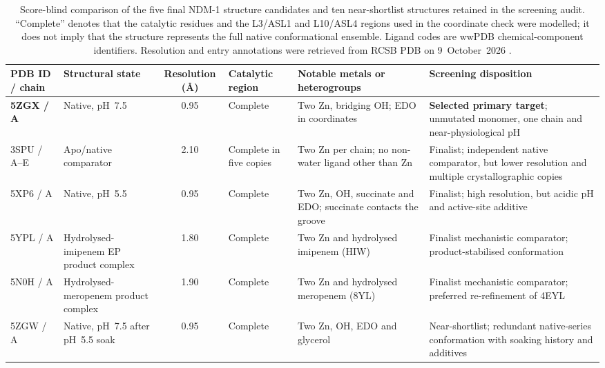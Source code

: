 \begin{table}[htbp]
  \centering
  \small
  \caption[NDM-1 structure candidates considered during target selection]{%
  Score-blind comparison of the five final NDM-1 structure candidates and
  ten near-shortlist structures retained in the screening audit. ``Complete''
  denotes that the catalytic residues and the L3/ASL1 and L10/ASL4 regions
  used in the coordinate check were modelled; it does not imply that the
  structure represents the full native conformational ensemble. Ligand codes
  are wwPDB chemical-component identifiers. Resolution and entry annotations
  were retrieved from RCSB PDB on 9~October~2026
  \cite{berman_protein_2000}.}
  \label{tab:ndm1-structure-screen}
  \begin{tabularx}{\textwidth}{@{}llclXX@{}}
    \toprule
    PDB ID / chain & Structural state & Resolution
      (\AA{}) & Catalytic region & Notable metals or heterogroups
      & Screening disposition \\
    \midrule
    \textbf{5ZGX / A} & Native, pH~7.5 & 0.95 & Complete
      & Two Zn, bridging OH; EDO in coordinates
      & \textbf{Selected primary target}; unmutated monomer, one chain and
        near-physiological pH \\
    3SPU / A--E & Apo/native comparator & 2.10 & Complete in five copies
      & Two Zn per chain; no non-water ligand other than Zn
      & Finalist; independent native comparator, but lower resolution and
        multiple crystallographic copies \\
    5XP6 / A & Native, pH~5.5 & 0.95 & Complete
      & Two Zn, OH, succinate and EDO; succinate contacts the groove
      & Finalist; high resolution, but acidic pH and active-site additive \\
    5YPL / A & Hydrolysed-imipenem EP product complex & 1.80 & Complete
      & Two Zn and hydrolysed imipenem (HIW)
      & Finalist mechanistic comparator; product-stabilised conformation \\
    5N0H / A & Hydrolysed-meropenem product complex & 1.90 & Complete
      & Two Zn and hydrolysed meropenem (8YL)
      & Finalist mechanistic comparator; preferred re-refinement of 4EYL \\
    \midrule
    5ZGW / A & Native, pH~7.5 after pH~5.5 soak & 0.95 & Complete
      & Two Zn, OH, EDO and glycerol
      & Near-shortlist; redundant native-series conformation with soaking
        history and additives \\

\end{tabularx}
\end{table}
